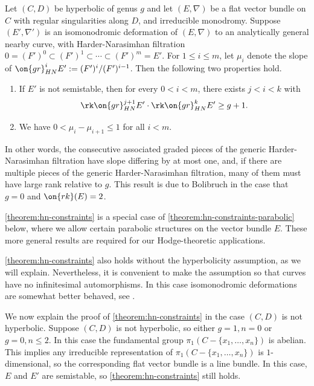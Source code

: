 \begin{theorem}
\notready
	\label{theorem:hn-constraints}
	Let $(C,D)$ be hyperbolic of genus $g$ and let
	$({E}, \nabla)$ be a flat
	vector bundle on $C$ with regular singularities along $D$,
	and irreducible
monodromy.
Suppose
 $(E',\nabla')$
is an isomonodromic deformation
of $({E}, \nabla)$ to an analytically general nearby curve,
with Harder-Narasimhan filtration $0 = (F')^0 \subset (F')^1 \subset \cdots \subset
(F')^m =
E'$. For $1 \leq i \leq m$, let $\mu_i$ denote the slope of
$\on{gr}^{i}_{HN}E' := (F')^i/(F')^{i-1}$.
Then the following two properties hold.
\begin{enumerate}
	\item If $E'$ is not semistable, then for every $0 < i < m$, there
	exists $j < i < k$ with $$\rk \on{gr}^{j+1}_{HN}E'\cdot \rk
	\on{gr}^k_{HN}E'\geq g+1.$$
\item We have $0<\mu_i-\mu_{i+1}\leq 1$ for all $i<m$.
\end{enumerate}
\end{theorem}

In other words, the consecutive associated graded pieces of the generic
Harder-Narasimhan filtration have slope differing by at most one, and, if there
are multiple pieces of the generic Harder-Narasimhan filtration, many of them must have large rank relative to $g$.  This result is due to Bolibruch \cite[Proposition 5.6]{bolibrukh1990riemann} in the case that $g=0$ and $\on{rk}(E)=2$.

\autoref{theorem:hn-constraints} is a special case of
\autoref{theorem:hn-constraints-parabolic} below, where we allow certain
parabolic structures on the vector bundle $E$. These more general results are required for our Hodge-theoretic applications.
\begin{remark}
\notready
	\label{remark:}
	\autoref{theorem:hn-constraints} also holds without the hyperbolicity
	assumption, as we will explain. Nevertheless, it is convenient to make the assumption
	so that curves have no infinitesimal automorphisms. In this case
	isomonodromic deformations are somewhat better behaved, see
	\cite[p. 518]{Heu:universal-isomonodromic}.

	We now explain the proof of \autoref{theorem:hn-constraints} in the case
	$(C, D)$ is not hyperbolic.
	Suppose $(C, D)$ is not hyperbolic, so either $g = 1, n = 0$ or $g = 0, n \leq 2$. In
this case the fundamental group $\pi_1(C - \{x_1, \ldots, x_n\})$ is abelian.
This implies any irreducible representation of $\pi_1(C - \{x_1, \ldots, x_n\})$
is $1$-dimensional, so the corresponding flat vector bundle is a line bundle. In
this case, $E$ and $E'$ are semistable, so
\autoref{theorem:hn-constraints} still holds.
\end{remark}


